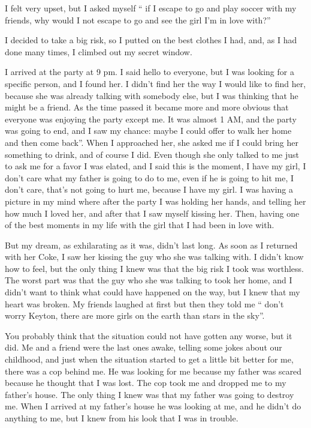 I felt very upset, but I asked myself “ if I escape to go and play soccer with my friends, why would I not escape to go and see the girl I’m in love with?”

I decided to take a big risk, so I putted on the best clothes I had, and, as I had done many times, I climbed out my secret window.

I arrived at the party at 9 pm. I said hello to everyone, but I was looking for a specific person, and I found her. I didn’t find her the way I would like to find her, because she was already talking with somebody else, but I was thinking that he might be a friend. As the time passed it became more and more obvious that everyone was enjoying the party except me. It was almost 1 AM, and the party was going to end, and I saw my chance: maybe I could offer to walk her home and then come back”. When I approached her, she asked me if I could bring her something to drink, and of course I did.  Even though she only talked to me just to ask me for a favor I was elated, and I said this is the moment, I have my girl, I don’t care what my father is going to do to me, even if he is going to hit me, I don’t care, that’s not going to hurt me, because I have my girl. I was having a picture in my mind where after the party I was holding her hands, and telling her how much I loved her, and after that I saw myself kissing her. Then, having one of the best moments in my life with the girl that I had been in love with.               

But my dream, as exhilarating as it was, didn’t last long. As soon as I returned with her Coke, I saw her kissing the guy who she was talking with. I didn’t know how to feel, but the only thing I knew was that the big risk I took was worthless. The worst part was that the guy who she was talking to took her home, and I didn’t want to think what could have happened on the way, but I knew that my heart was broken. My friends laughed at first but then they told me “ don’t worry Keyton, there are more girls on the earth than stars in the sky”. 

You probably think that the situation could not have gotten any worse, but it did. Me and a friend were the last ones awake, telling some jokes about our childhood, and just when the situation started to get a little bit better for me, there was a cop behind me. He was looking for me because my father was scared because he thought that I was lost. The cop took me and dropped me to my father’s house. The only thing I knew was that my father was going to destroy me. When I arrived at my father’s house he was  looking at me, and he didn’t do anything to me, but I knew from his look that I was in trouble. 

